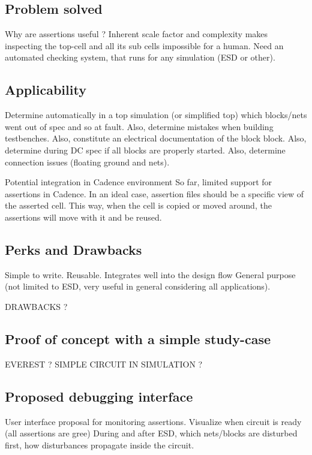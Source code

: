 \subsection{Problem solved}
Why are assertions useful ?
Inherent scale factor and complexity makes inspecting the top-cell and all its sub cells impossible for a human.
Need an automated checking system, that runs for any simulation (ESD or other).

\subsection{Applicability}

Determine automatically in a top simulation (or simplified top) which blocks/nets went out of spec and so at fault.
Also, determine mistakes when building testbenches.
Also, constitute an electrical documentation of the block block.
Also, determine during DC spec if all blocks are properly started.
Also, determine connection issues (floating ground and nets).

Potential integration in Cadence environment
So far, limited support for assertions in Cadence.
In an ideal case, assertion files should be a specific view of the asserted cell.
This way, when the cell is copied or moved around, the assertions will move with it and be reused.

\subsection{Perks and Drawbacks}

Simple to write.
Reusable.
Integrates well into the design flow
General purpose (not limited to ESD, very useful in general considering all applications).

DRAWBACKS ?

\subsection{Proof of concept with a simple study-case}

EVEREST ?
SIMPLE CIRCUIT IN SIMULATION ?

\subsection{Proposed debugging interface}

User interface proposal for monitoring assertions.
Visualize when circuit is ready (all assertions are gree)
During and after ESD, which nets/blocks are disturbed first, how disturbances propagate inside the circuit.
